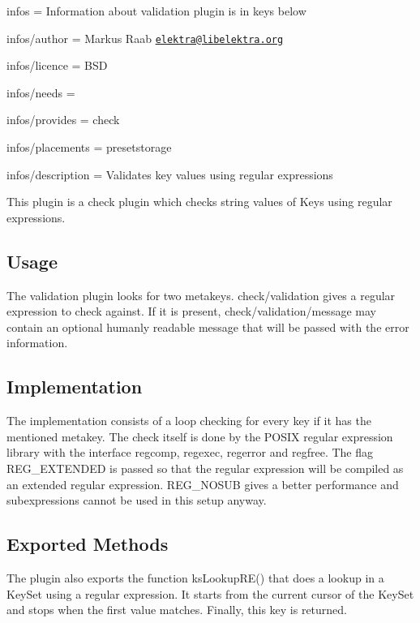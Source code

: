 
\begin{DoxyItemize}
\item infos = Information about validation plugin is in keys below
\item infos/author = Markus Raab \href{mailto:elektra@libelektra.org}{\tt elektra@libelektra.\+org}
\item infos/licence = B\+S\+D
\item infos/needs =
\item infos/provides = check
\item infos/placements = presetstorage
\item infos/description = Validates key values using regular expressions
\end{DoxyItemize}

This plugin is a check plugin which checks string values of Keys using regular expressions.

\subsection*{Usage}

The validation plugin looks for two metakeys. {\ttfamily check/validation} gives a regular expression to check against. If it is present, {\ttfamily check/validation/message} may contain an optional humanly readable message that will be passed with the error information.

\subsection*{Implementation}

The implementation consists of a loop checking for every key if it has the mentioned metakey. The check itself is done by the P\+O\+S\+I\+X regular expression library with the interface {\ttfamily regcomp}, {\ttfamily regexec}, {\ttfamily regerror} and {\ttfamily regfree}. The flag {\ttfamily R\+E\+G\+\_\+\+E\+X\+T\+E\+N\+D\+E\+D} is passed so that the regular expression will be compiled as an extended regular expression. {\ttfamily R\+E\+G\+\_\+\+N\+O\+S\+U\+B} gives a better performance and subexpressions cannot be used in this setup anyway.

\subsection*{Exported Methods}

The plugin also exports the function {\ttfamily ks\+Lookup\+R\+E()} that does a lookup in a Key\+Set using a regular expression. It starts from the current cursor of the Key\+Set and stops when the first value matches. Finally, this key is returned. 